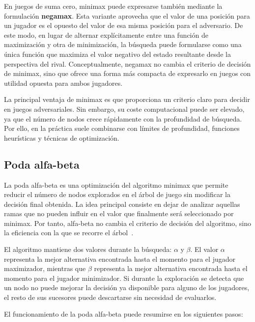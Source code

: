 En juegos de suma cero, minimax puede expresarse también mediante la formulación \textbf{negamax}. Esta variante aprovecha que el valor de una posición para un jugador es el opuesto del valor de esa misma posición para el adversario. De este modo, en lugar de alternar explícitamente entre una función de maximización y otra de minimización, la búsqueda puede formularse como una única función que maximiza el valor negativo del estado resultante desde la perspectiva del rival. Conceptualmente, negamax no cambia el criterio de decisión de minimax, sino que ofrece una forma más compacta de expresarlo en juegos con utilidad opuesta para ambos jugadores.

La principal ventaja de minimax es que proporciona un criterio claro para decidir en juegos adversariales. Sin embargo, su coste computacional puede ser elevado, ya que el número de nodos crece rápidamente con la profundidad de búsqueda. Por ello, en la práctica suele combinarse con límites de profundidad, funciones heurísticas y técnicas de optimización.


\subsection{Poda alfa-beta}

La poda alfa-beta es una optimización del algoritmo minimax que permite reducir el número de nodos explorados en el árbol de juego sin modificar la decisión final obtenida. La idea principal consiste en dejar de analizar aquellas ramas que no pueden influir en el valor que finalmente será seleccionado por minimax. Por tanto, alfa-beta no cambia el criterio de decisión del algoritmo, sino la eficiencia con la que se recorre el árbol~\cite{russell2020aima,poole2023foundations}.

El algoritmo mantiene dos valores durante la búsqueda: $\alpha$ y $\beta$. El valor $\alpha$ representa la mejor alternativa encontrada hasta el momento para el jugador maximizador, mientras que $\beta$ representa la mejor alternativa encontrada hasta el momento para el jugador minimizador. Si durante la exploración se detecta que un nodo no puede mejorar la decisión ya disponible para alguno de los jugadores, el resto de sus sucesores puede descartarse sin necesidad de evaluarlos.

El funcionamiento de la poda alfa-beta puede resumirse en los siguientes pasos:

